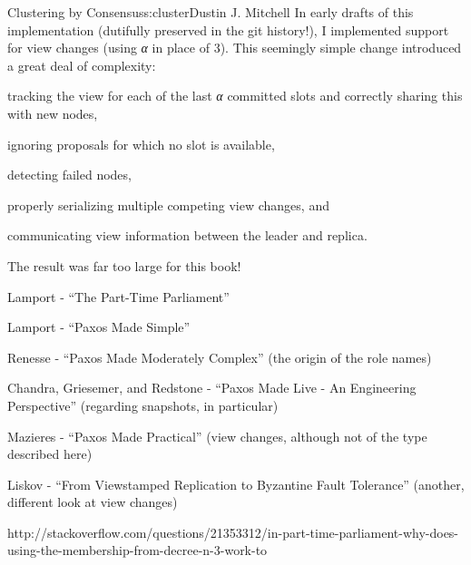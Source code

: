 \begin{aosachapter}{Clustering by Consensus}{s:cluster}{Dustin J. Mitchell}
In early drafts of this implementation (dutifully preserved in the git
history!), I implemented support for view changes (using \emph{α} in
place of 3). This seemingly simple change introduced a great deal of
complexity:

\begin{aosaitemize}

\item
  tracking the view for each of the last \emph{α} committed slots and
  correctly sharing this with new nodes,
\item
  ignoring proposals for which no slot is available,
\item
  detecting failed nodes,
\item
  properly serializing multiple competing view changes, and
\item
  communicating view information between the leader and replica.
\end{aosaitemize}

The result was far too large for this book!

\label{references}

\begin{aosaitemize}

\item
  Lamport - ``The Part-Time Parliament''
\item
  Lamport - ``Paxos Made Simple''
\item
  Renesse - ``Paxos Made Moderately Complex'' (the origin of the role
  names)
\item
  Chandra, Griesemer, and Redstone - ``Paxos Made Live - An Engineering
  Perspective'' (regarding snapshots, in particular)
\item
  Mazieres - ``Paxos Made Practical'' (view changes, although not of the
  type described here)
\item
  Liskov - ``From Viewstamped Replication to Byzantine Fault Tolerance''
  (another, different look at view changes)
\item
  http://stackoverflow.com/questions/21353312/in-part-time-parliament-why-does-using-the-membership-from-decree-n-3-work-to
\end{aosaitemize}

\end{aosachapter}
